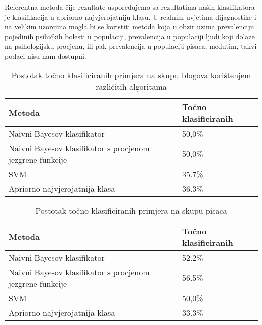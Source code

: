 \documentclass[10pt, a4paper]{article}
\begin{document}
Referentna metoda čije rezultate uspoređujemo sa rezultatima naših klasifikatora je klasifikacija u apriorno najvjerojatniju klasu. U realnim uvjetima dijagnostike i na velikim uzorcima mogla bi se koristiti metoda koja u obzir uzima prevalenciju pojedinih psihičkih bolesti u populaciji, prevalencija u populaciji ljudi koji dolaze na psihologijsku procjenu, ili pak prevalencija u populaciji pisaca, međutim, takvi podaci nisu nam dostupni.

\begin{table*}
\caption{Postotak točno klasificiranih primjera  na skupu blogova korištenjem različitih algoritama}
\label{tab:rezultati}
\begin{center}
\begin{tabular}{ll}
\toprule
Metoda & Točno klasificiranih \\
\midrule
Naivni Bayesov klasifikator & 50,0\%\\
Naivni Bayesov klasifikator s procjenom jezgrene funkcije   & 50,0\%\\
SVM   & 35.7\%\\
Apriorno najvjerojatnija klasa & 36.3\%\\
\bottomrule
\end{tabular}
\end{center}
\end{table*}
\begin{table*}
\caption{Postotak točno klasificiranih primjera na skupu pisaca }
\begin{center}
\begin{tabular}{ll}
\toprule
Metoda & Točno klasificiranih\\
\midrule
Naivni Bayesov klasifikator & 52.2\%\\
Naivni Bayesov klasifikator s procjenom jezgrene funkcije & 56.5\%\\
SVM & 50,0\%\\
Apriorno najvjerojatnija klasa & 33.3\%\\
\bottomrule
\end{tabular}
\end{center}
\end{table*}
\end{document}
